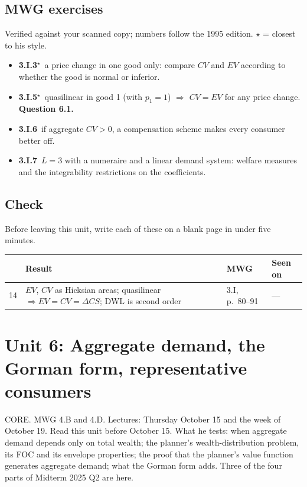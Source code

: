 \documentclass[11pt]{article}
\begin{document}
\subsection{MWG exercises}
\begin{todo}{Verified against your scanned copy; numbers follow the 1995 edition. $\star$ = closest to his style.}
\begin{itemize}
\item \textbf{3.I.3}$^\star$\ a price change in one good only: compare $CV$ and $EV$ according to whether the good is normal or inferior.
\item \textbf{3.I.5}$^\star$\ quasilinear in good 1 (with $p_1=1$) $\Rightarrow$ $CV=EV$ for any price change. \textbf{Question 6.1.}
\item \textbf{3.I.6}\ if aggregate $CV>0$, a compensation scheme makes every consumer better off.
\item \textbf{3.I.7}\ $L=3$ with a numeraire and a linear demand system: welfare measures and the integrability restrictions on the coefficients.
\end{itemize}
\end{todo}
\subsection{Check}
Before leaving this unit, write each of these on a blank page in under five minutes.
\begin{center}\small\begin{tabular}{rp{7.4cm}p{3.3cm}p{3.1cm}}\toprule & Result & MWG & Seen on\\\midrule
14 & $EV$, $CV$ as Hicksian areas; quasilinear $\Rightarrow EV=CV=\Delta CS$; DWL is second order & 3.I, p.~80--91 & ---\\
\bottomrule\end{tabular}\end{center}

\clearpage
\section{Unit 6: Aggregate demand, the Gorman form, representative consumers}
\begin{unit}{CORE. MWG 4.B and 4.D. Lectures: Thursday October 15 and the week of October 19. Read this unit before October 15.}
What he tests: when aggregate demand depends only on total wealth; the planner's wealth-distribution problem, its FOC and its envelope properties; the proof that the planner's value function generates aggregate demand; what the Gorman form adds. Three of the four parts of Midterm 2025 Q2 are here.
\end{unit}
\end{document}
